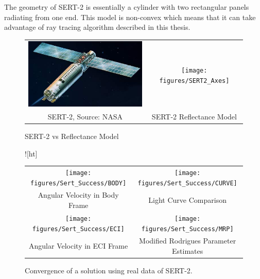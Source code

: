 The geometry of SERT-2 is essentially a cylinder with two rectangular panels radiating from one end. This model is non-convex which means that it can take advantage of ray tracing algorithm described in this thesis. 

\begin{figure}[ht]
	\begin{tabular}{cc}
	\includegraphics[width = 80mm]{figures/sert-2} & \texttt{[image: figures/SERT2\_Axes]} \\
	SERT-2, Source: NASA & SERT-2 Reflectance Model 
	
	\end{tabular}
	\caption{SERT-2 vs Reflectance Model}
\end{figure}

\begin{figure}![ht]
	\begin{tabular}{cc}
		\texttt{[image: figures/Sert\_Success/BODY]} &
		\texttt{[image: figures/Sert\_Success/CURVE]} \\
		Angular Velocity in Body Frame & Light Curve Comparison \\
		\texttt{[image: figures/Sert\_Success/ECI]} &
		\texttt{[image: figures/Sert\_Success/MRP]} \\
		Angular Velocity in ECI Frame & Modified Rodrigues Parameter Estimates
	\end{tabular}
	\caption{Convergence of a solution using real data of SERT-2.}
\end{figure}

